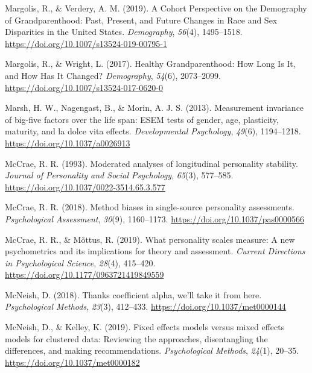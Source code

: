 \documentclass[
  english,
  man, noextraspace]{apa7}
\begin{document}
\leavevmode\hypertarget{ref-margolisCohortPerspectiveDemography2019}{}%
Margolis, R., \& Verdery, A. M. (2019). A Cohort Perspective on the Demography of Grandparenthood: Past, Present, and Future Changes in Race and Sex Disparities in the United States. \emph{Demography}, \emph{56}(4), 1495--1518. \url{https://doi.org/10.1007/s13524-019-00795-1}

\leavevmode\hypertarget{ref-margolisHealthyGrandparenthoodHow2017}{}%
Margolis, R., \& Wright, L. (2017). Healthy Grandparenthood: How Long Is It, and How Has It Changed? \emph{Demography}, \emph{54}(6), 2073--2099. \url{https://doi.org/10.1007/s13524-017-0620-0}

\leavevmode\hypertarget{ref-marshMeasurementInvarianceBigfive2013}{}%
Marsh, H. W., Nagengast, B., \& Morin, A. J. S. (2013). Measurement invariance of big-five factors over the life span: ESEM tests of gender, age, plasticity, maturity, and la dolce vita effects. \emph{Developmental Psychology}, \emph{49}(6), 1194--1218. \url{https://doi.org/10.1037/a0026913}

\leavevmode\hypertarget{ref-mccraeModeratedAnalysesLongitudinal1993}{}%
McCrae, R. R. (1993). Moderated analyses of longitudinal personality stability. \emph{Journal of Personality and Social Psychology}, \emph{65}(3), 577--585. \url{https://doi.org/10.1037/0022-3514.65.3.577}

\leavevmode\hypertarget{ref-mccraeMethodBiasesSinglesource2018}{}%
McCrae, R. R. (2018). Method biases in single-source personality assessments. \emph{Psychological Assessment}, \emph{30}(9), 1160--1173. \url{https://doi.org/10.1037/pas0000566}

\leavevmode\hypertarget{ref-mccraeWhatPersonalityScales2019}{}%
McCrae, R. R., \& Mõttus, R. (2019). What personality scales measure: A new psychometrics and its implications for theory and assessment. \emph{Current Directions in Psychological Science}, \emph{28}(4), 415--420. \url{https://doi.org/10.1177/0963721419849559}

\leavevmode\hypertarget{ref-mcneishThanksCoefficientAlpha2018}{}%
McNeish, D. (2018). Thanks coefficient alpha, we'll take it from here. \emph{Psychological Methods}, \emph{23}(3), 412--433. \url{https://doi.org/10.1037/met0000144}

\leavevmode\hypertarget{ref-mcneishFixedEffectsModels2019}{}%
McNeish, D., \& Kelley, K. (2019). Fixed effects models versus mixed effects models for clustered data: Reviewing the approaches, disentangling the differences, and making recommendations. \emph{Psychological Methods}, \emph{24}(1), 20--35. \url{https://doi.org/10.1037/met0000182}
\end{document}
